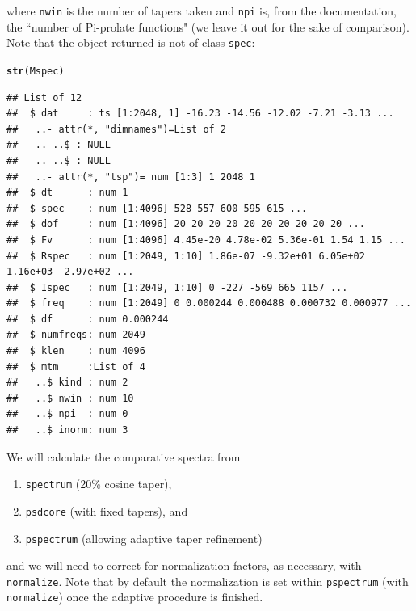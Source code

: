 \documentclass{article}\usepackage{graphicx, color}
\makeatletter
\newcommand{\hlfunctioncall}[1]{\textcolor[rgb]{0.501960784313725,0,0.329411764705882}{\textbf{#1}}}%
\newenvironment{kframe}{%
 \def\at@end@of@kframe{}%
 \ifinner\ifhmode%
  \def\at@end@of@kframe{\end{minipage}}%
  \begin{minipage}{\columnwidth}%
 \fi\fi%
 \def\FrameCommand##1{\hskip\@totalleftmargin \hskip-\fboxsep
 \colorbox{shadecolor}{##1}\hskip-\fboxsep
     \hskip-\linewidth \hskip-\@totalleftmargin \hskip\columnwidth}%
 \MakeFramed {\advance\hsize-\width
   \@totalleftmargin\z@ \linewidth\hsize
   \@setminipage}}%
 {\par\unskip\endMakeFramed%
 \at@end@of@kframe}
\newenvironment{knitrout}{}{} %
\newcommand{\Rcmd}[1]{\texttt{#1}}
\makeatother
\begin{document}
where \Rcmd{nwin} is the number of tapers taken and
\Rcmd{npi} is, from the documentation, the ``number of Pi-prolate functions" (we
leave it out for the sake of comparison). 
Note that the object returned
is not of class \Rcmd{spec}:
\begin{knitrout}
\color{fgcolor}\begin{kframe}
\begin{alltt}
\hlfunctioncall{str}(Mspec)
\end{alltt}
\begin{verbatim}
## List of 12
##  $ dat     : ts [1:2048, 1] -16.23 -14.56 -12.02 -7.21 -3.13 ...
##   ..- attr(*, "dimnames")=List of 2
##   .. ..$ : NULL
##   .. ..$ : NULL
##   ..- attr(*, "tsp")= num [1:3] 1 2048 1
##  $ dt      : num 1
##  $ spec    : num [1:4096] 528 557 600 595 615 ...
##  $ dof     : num [1:4096] 20 20 20 20 20 20 20 20 20 20 ...
##  $ Fv      : num [1:4096] 4.45e-20 4.78e-02 5.36e-01 1.54 1.15 ...
##  $ Rspec   : num [1:2049, 1:10] 1.86e-07 -9.32e+01 6.05e+02 1.16e+03 -2.97e+02 ...
##  $ Ispec   : num [1:2049, 1:10] 0 -227 -569 665 1157 ...
##  $ freq    : num [1:2049] 0 0.000244 0.000488 0.000732 0.000977 ...
##  $ df      : num 0.000244
##  $ numfreqs: num 2049
##  $ klen    : num 4096
##  $ mtm     :List of 4
##   ..$ kind : num 2
##   ..$ nwin : num 10
##   ..$ npi  : num 0
##   ..$ inorm: num 3
\end{verbatim}
\end{kframe}
\end{knitrout}


We will calculate the comparative spectra
from
\begin{enumerate}
  \item \Rcmd{spectrum} (20\% cosine taper),
  \item \Rcmd{psdcore} (with fixed tapers), and
  \item \Rcmd{pspectrum} (allowing adaptive taper refinement)
\end{enumerate}
and we will need to correct for normalization factors, as necessary, with
\Rcmd{normalize}. Note that by default the normalization is
set within \Rcmd{pspectrum} (with \Rcmd{normalize}) once the adaptive procedure
is finished.
\end{document}
